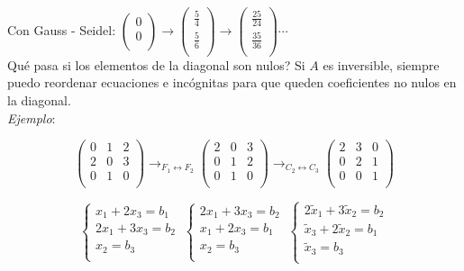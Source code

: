 Con Gauss - Seidel: $
	\begin{pmatrix}
        0\\
        0\\
	\end{pmatrix}
	\rightarrow
	\begin{pmatrix}
        \frac{5}{4}\\
        \frac{5}{6}\\
	\end{pmatrix}
	\rightarrow
	\begin{pmatrix}
        \frac{25}{24}\\
        \frac{35}{36}\\
	\end{pmatrix}
	\cdots
$\\

Qu\'e pasa si los elementos de la diagonal son nulos? Si $A$ es inversible, siempre puedo reordenar ecuaciones e inc\'ognitas para que queden coeficientes no nulos en la diagonal.\\

\textit{Ejemplo}:

$$
	\begin{pmatrix}
        0 & 1 & 2\\
        2 & 0 & 3\\
        0 & 1 & 0\\
	\end{pmatrix}
	\rightarrow_{
	F_{1} \leftrightarrow F_{2}}
    \begin{pmatrix}
        2 & 0 & 3\\
        0 & 1 & 2\\
        0 & 1 & 0\\
	\end{pmatrix}
	\rightarrow_{
	C_{2} \leftrightarrow C_{3}}
	\begin{pmatrix}
        2 & 3 & 0\\
        0 & 2 & 1\\
        0 & 0 & 1\\
	\end{pmatrix}
$$

$$ 
	\begin{cases}
		x_{1} + 2x_{3} = b_{1}\\
		2x_{1} + 3x_{3} = b_{2}\\
		x_{2} = b_{3}\\
    \end{cases}
    \
    \begin{cases}
		2x_{1} + 3x_{3} = b_{2}\\
		x_{1} + 2x_{3} = b_{1}\\
		x_{2} = b_{3}\\
    \end{cases}
    \
    \begin{cases}
		2\tilde{x}_{1} + 3\tilde{x}_{2} = b_{2}\\
		\tilde{x}_{3} + 2\tilde{x}_{2} = b_{1}\\
		\tilde{x}_{3} = b_{3}\\
    \end{cases}
$$

